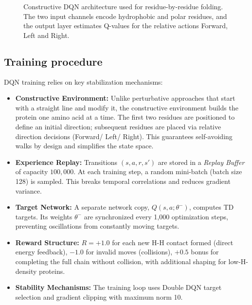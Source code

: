\begin{figure}[htbp]
\caption[Constructive DQN architecture]{Constructive DQN architecture used for residue-by-residue folding. The two input channels encode hydrophobic and polar residues, and the output layer estimates Q-values for the relative actions Forward, Left and Right.}
\label{fig:dqn_architecture}
\end{figure}

\subsection{Training procedure}
\label{cap2:subsec_dqn_training}

DQN training relies on key stabilization mechanisms:

\begin{itemize}
    \item \textbf{Constructive Environment:} Unlike perturbative approaches that start with a straight line and modify it, the constructive environment builds the protein one amino acid at a time. The first two residues are positioned to define an initial direction; subsequent residues are placed via relative direction decisions (Forward/ Left/ Right). This guarantees self-avoiding walks by design and simplifies the state space.
    \item \textbf{Experience Replay:} Transitions $(s, a, r, s')$ are stored in a \textit{Replay Buffer} of capacity $100{,}000$. At each training step, a random mini-batch (batch size 128) is sampled. This breaks temporal correlations and reduces gradient variance.
    \item \textbf{Target Network:} A separate network copy, $Q(s, a; \theta^-)$, computes TD targets. Its weights $\theta^-$ are synchronized every 1,000 optimization steps, preventing oscillations from constantly moving targets.
    \item \textbf{Reward Structure:} $R = +1.0$ for each new H-H contact formed (direct energy feedback), $-1.0$ for invalid moves (collisions), $+0.5$ bonus for completing the full chain without collision, with additional shaping for low-H-density proteins.
    \item \textbf{Stability Mechanisms:} The training loop uses Double DQN target selection and gradient clipping with maximum norm 10.
\end{itemize}

